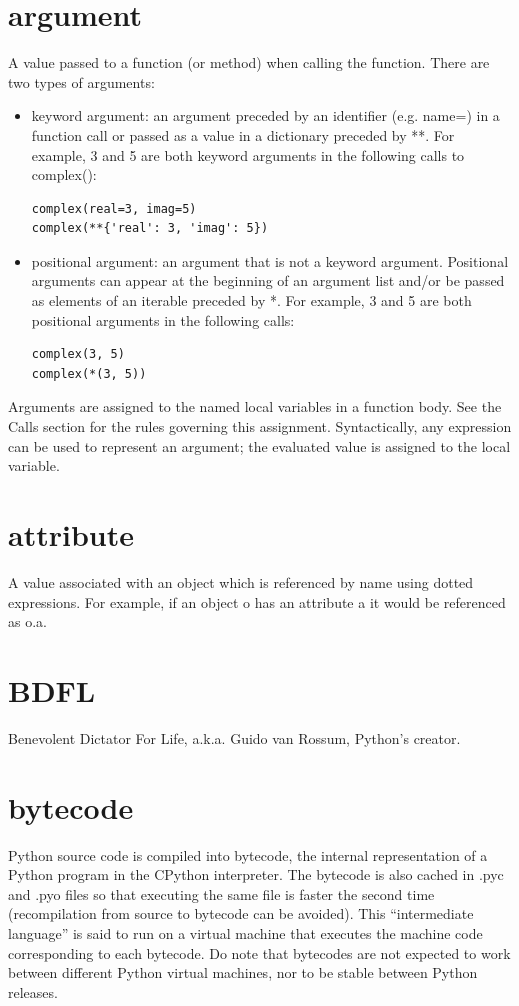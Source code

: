\documentclass[12pt,a4paper,final,twoside,onecolumn,titlepage]{book}
\begin{document}
\section{argument}
A value passed to a function (or method) when calling the function. There are two types of arguments:
\begin{itemize}
\item keyword argument: an argument preceded by an identifier (e.g. name=) in a function call or passed as a value in a dictionary preceded by **. For example, 3 and 5 are both keyword arguments in the following calls to complex():
\begin{lstlisting}
complex(real=3, imag=5)
complex(**{'real': 3, 'imag': 5})
\end{lstlisting}
\item positional argument: an argument that is not a keyword argument. Positional arguments can appear at the beginning of an argument list and/or be passed as elements of an iterable preceded by *. For example, 3 and 5 are both positional arguments in the following calls:
\begin{lstlisting}
complex(3, 5)
complex(*(3, 5))
\end{lstlisting}
\end{itemize}
Arguments are assigned to the named local variables in a function body. See the Calls section for the rules governing this assignment. Syntactically, any expression can be used to represent an argument; the evaluated value is assigned to the local variable.

\section{attribute}
A value associated with an object which is referenced by name using dotted expressions. For example, if an object o has an attribute a it would be referenced as o.a.

\section{BDFL}
Benevolent Dictator For Life, a.k.a. Guido van Rossum, Python’s creator.

\section{bytecode}
Python source code is compiled into bytecode, the internal representation of a Python program in the CPython interpreter. The bytecode is also cached in .pyc and .pyo files so that executing the same file is faster the second time (recompilation from source to bytecode can be avoided). This “intermediate language” is said to run on a virtual machine that executes the machine code corresponding to each bytecode. Do note that bytecodes are not expected to work between different Python virtual machines, nor to be stable between Python releases.
\end{document}
